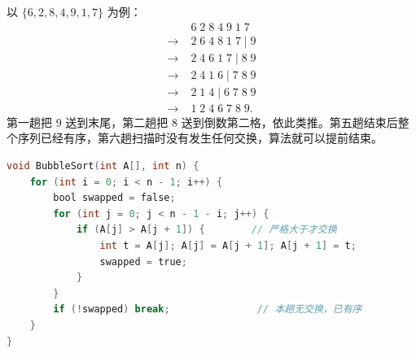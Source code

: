以 $\{6,2,8,4,9,1,7\}$ 为例：
\[
\begin{aligned}
&6\;2\;8\;4\;9\;1\;7\\
\to\;&2\;6\;4\;8\;1\;7\mid 9\\
\to\;&2\;4\;6\;1\;7\mid 8\;9\\
\to\;&2\;4\;1\;6\mid 7\;8\;9\\
\to\;&2\;1\;4\mid 6\;7\;8\;9\\
\to\;&1\;2\;4\;6\;7\;8\;9.
\end{aligned}
\]
第一趟把 9 送到末尾，第二趟把 8 送到倒数第二格，依此类推。第五趟结束后整个序列已经有序，第六趟扫描时没有发生任何交换，算法就可以提前结束。

\begin{lstlisting}[language=C]
void BubbleSort(int A[], int n) {
    for (int i = 0; i < n - 1; i++) {
        bool swapped = false;
        for (int j = 0; j < n - 1 - i; j++) {
            if (A[j] > A[j + 1]) {        // 严格大于才交换
                int t = A[j]; A[j] = A[j + 1]; A[j + 1] = t;
                swapped = true;
            }
        }
        if (!swapped) break;               // 本趟无交换，已有序
    }
}
\end{lstlisting}

